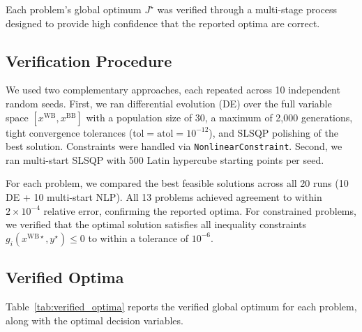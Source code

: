 \documentclass[12pt,a4paper]{article}%
\theoremstyle{plain}%
\theoremstyle{remark}%
\theoremstyle{definition}%
\def\WB{\mathrm{WB}}
\def\BB{\mathrm{BB}}
\begin{document}
\begin{appendices}
Each problem's global optimum $J^\star$ was verified through a multi-stage process designed to provide high confidence that the reported optima are correct.

\subsection{Verification Procedure}\label{subsec:verification_procedure}

We used two complementary approaches, each repeated across 10 independent random seeds. First, we ran differential evolution (DE) over the full variable space $[x^{\WB}, x^{\BB}]$ with a population size of 30, a maximum of 2{,}000 generations, tight convergence tolerances ($\text{tol} = \text{atol} = 10^{-12}$), and SLSQP polishing of the best solution. Constraints were handled via \texttt{NonlinearConstraint}. Second, we ran multi-start SLSQP with 500 Latin hypercube starting points per seed.

For each problem, we compared the best feasible solutions across all 20 runs (10 DE + 10 multi-start NLP). All 13 problems achieved agreement to within $2 \times 10^{-4}$ relative error, confirming the reported optima. For constrained problems, we verified that the optimal solution satisfies all inequality constraints $g_i(x^{\WB\star}, y^\star) \leq 0$ to within a tolerance of $10^{-6}$.

\subsection{Verified Optima}\label{subsec:verified_optima}

Table~\ref{tab:verified_optima} reports the verified global optimum for each problem, along with the optimal decision variables.


\end{appendices}
\end{document}
